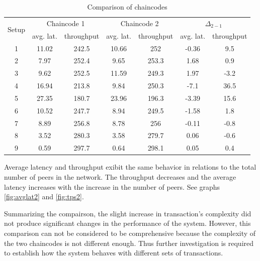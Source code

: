 \begin{table}[h!]
\begin{center}
\begin{tabular}{ c|c|c|c|c|c|c }
  \multirow{2}{*}{Setup} &
  \multicolumn{2}{c|}{Chaincode 1} &
  \multicolumn{2}{c|}{Chaincode 2} &
  \multicolumn{2}{c}{$\Delta_{2 - 1}$} \\ \cline{2-7}
   & avg. lat. & throughput & avg. lat. & throughput & avg. lat. & throughput \\
 \hline
 \hline
 1 & 11.02 & 242.5 & 10.66 & 252 & -0.36 & 9.5 \\
 \hline
 2 & 7.97 & 252.4 & 9.65 & 253.3 & 1.68 & 0.9 \\
 \hline
 3 & 9.62 & 252.5 & 11.59 & 249.3 & 1.97 & -3.2 \\
 \hline
 4 & 16.94 & 213.8 & 9.84 & 250.3 & -7.1 & 36.5 \\
 \hline
 5 & 27.35 & 180.7 & 23.96 & 196.3 & -3.39 & 15.6 \\
 \hline
 6 & 10.52 & 247.7 & 8.94 & 249.5 & -1.58 & 1.8 \\
 \hline
 7 & 8.89 & 256.8 & 8.78 & 256 & -0.11 & -0.8 \\
 \hline
 8 & 3.52 & 280.3 & 3.58 & 279.7 & 0.06 & -0.6 \\
 \hline
 9 & 0.59 & 297.7 & 0.64 & 298.1 & 0.05 & 0.4 \\
 \hline
\end{tabular}
\end{center}
\caption{Comparison of chaincodes}
\label{table:compare}
\end{table}

Average latency and throughput exibit the same behavior in relations to the total number of peers in the network. The throughput decreases and the average latency increases with the increase in the number of peers. See graphs \ref{fig:avglat2} and \ref{fig:tps2}.

Summarizing the compairson, the slight increase in transaction's complexity did not produce significant changes in the performance of the system. However, this comparison can not be considered to be comprehensive because the complexity of the two chaincodes is not different enough. Thus further investigation is required to establish how the system behaves with different sets of transactions.

